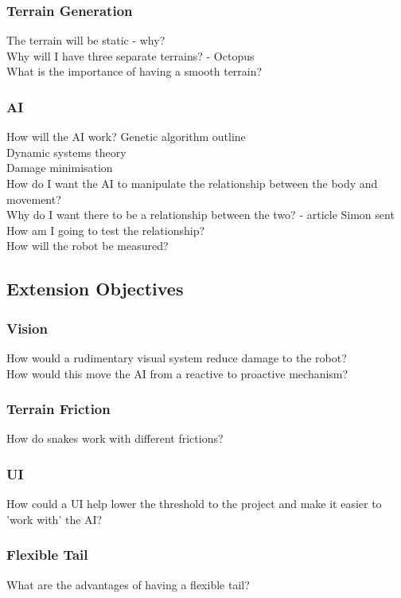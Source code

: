 \documentclass{article}
\begin{document}
\subsubsection{Terrain Generation}
The terrain will be static - why?\\
Why will I have three separate terrains? - Octopus\\
What is the importance of having a smooth terrain?\\
\subsubsection{AI}
How will the AI work? Genetic algorithm outline\\
Dynamic systems theory\\
Damage minimisation\\
How do I want the AI to manipulate the relationship between the body and movement?\\
Why do I want there to be a relationship between the two? - article Simon sent\\
How am I going to test the relationship?\\
How will the robot be measured?\\

\subsection{Extension Objectives}
\subsubsection{Vision}
How would a rudimentary visual system reduce damage to the robot?\\
How would this move the AI from a reactive to proactive mechanism?\\
\subsubsection{Terrain Friction}
How do snakes work with different frictions?\\
\subsubsection{UI}
How could a UI help lower the threshold to the project and make it easier to 'work with' the AI?\\
\subsubsection{Flexible Tail}
What are the advantages of having a flexible tail?\\
\end{document}
